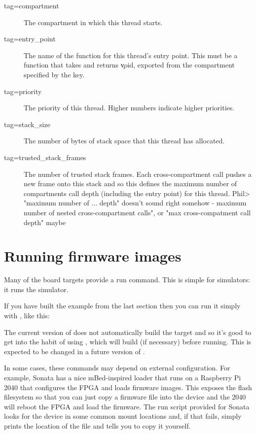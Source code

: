 \begin{description}
	\item[tag=compartment]{ The compartment in which this thread starts.}
	\item[tag=entry_point]{ The name of the function for this thread's entry point.
		This must be a function that takes and returns \c{void}, exported from the compartment specified by the  key.}
	\item[tag=priority]{ The priority of this thread.
		Higher numbers indicate higher priorities.}
	\item[tag=stack_size]{ The number of bytes of stack space that this thread has allocated.}
	\item[tag=trusted_stack_frames]{ The number of trusted stack frames.
		Each cross-compartment call pushes a new frame onto this stack and so this defines the maximum number of compartments call depth (including the entry point) for this thread.}
Phil> "maximum number of ... depth" doesn't sound right somehow - maximum number of nested cross-compartment calls", or "max cross-compatment call depth" maybe
\end{description}

\section{Running firmware images}

Many of the board targets provide a run command.
This is simple for simulators: it runs the simulator.

If you have built the example from the last section then you can run it simply with , like this:


\begin{note}
	The current version of  does not automatically build the target and so it's good to get into the habit of using , which will build (if necessary) before running.
	This is expected to be changed in a future version of .
\end{note}

In some cases, these commands may depend on external configuration.
For example, Sonata has a nice mBed-inspired loader that runs on a Raspberry Pi 2040 that configures the FPGA and loads firmware images.
This exposes the flash filesystem so that you can just copy a firmware file into the  device and the 2040 will reboot the FPGA and load the firmware.
The run script provided for Sonata looks for the  device in some common mount locations and, if that fails, simply prints the location of the file and tells you to copy it yourself.

